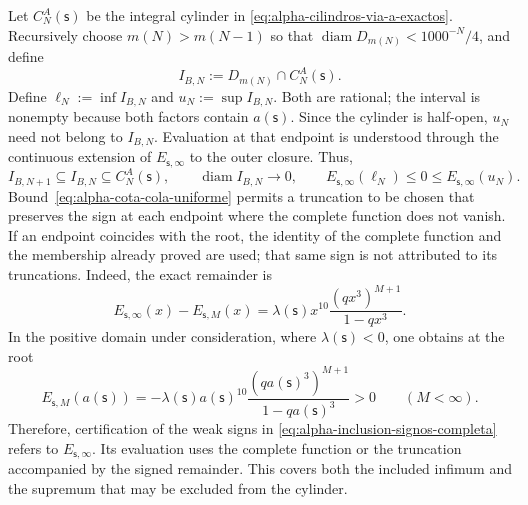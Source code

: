Let \(C_N^A(\mathsf s)\) be the integral cylinder in
\eqref{eq:alpha-cilindros-via-a-exactos}. Recursively choose
\(m(N)>m(N-1)\) so that \(\operatorname{diam}D_{m(N)}<1000^{-N}/4\), and
define
\begin{equation}
I_{B,N}:=D_{m(N)}\cap C_N^A(\mathsf s).
 \label{eq:alpha-intervalos-b-completos}
\end{equation}
Define \(\ell_N:=\inf I_{B,N}\) and \(u_N:=\sup I_{B,N}\). Both are
rational; the interval is nonempty because both factors contain
\(a(\mathsf s)\). Since the cylinder is half-open, \(u_N\) need not belong
to \(I_{B,N}\). Evaluation at that endpoint is understood through the
continuous extension of \(E_{\mathsf s,\infty}\) to the outer closure. Thus,
\begin{equation}
 I_{B,N+1}\subseteq I_{B,N}\subseteq C_N^A(\mathsf s),
 \qquad \operatorname{diam}I_{B,N}\longrightarrow0,
 \qquad E_{\mathsf s,\infty}(\ell_N)\leq0\leq
 E_{\mathsf s,\infty}(u_N).
 \label{eq:alpha-inclusion-signos-completa}
\end{equation}
Bound~\eqref{eq:alpha-cota-cola-uniforme} permits a truncation to be chosen
that preserves the sign at each endpoint where the complete function does not
vanish. If an endpoint coincides with the root, the identity of the complete
function and the membership already proved are used; that same sign is not
attributed to its truncations. Indeed, the exact remainder is
\[
 E_{\mathsf s,\infty}(x)-E_{\mathsf s,M}(x)
 =\lambda(\mathsf s)x^{10}
   \frac{(qx^3)^{M+1}}{1-qx^3}.
\]
In the positive domain under consideration, where \(\lambda(\mathsf s)<0\),
one obtains at the root
\[
 E_{\mathsf s,M}(a(\mathsf s))
 =-\lambda(\mathsf s)a(\mathsf s)^{10}
   \frac{(qa(\mathsf s)^3)^{M+1}}{1-qa(\mathsf s)^3}>0
 \qquad(M<\infty).
\]
Therefore, certification of the weak signs in
\eqref{eq:alpha-inclusion-signos-completa} refers to
\(E_{\mathsf s,\infty}\). Its evaluation uses the complete function or the
truncation accompanied by the signed remainder. This covers both the included
infimum and the supremum that may be excluded from the cylinder.

